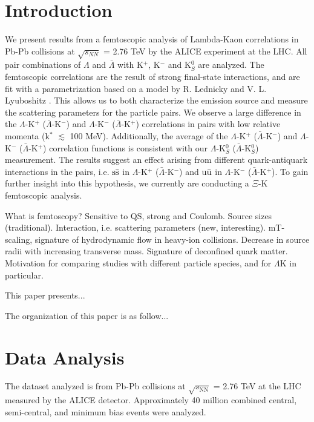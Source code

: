 \documentclass[ALICE,manyauthors]{cernphprep}
\newcommand{\LamK}{$\Lambda$K\xspace}
\begin{document}
\section{Introduction}
\label{sec:Introduction}
We present results from a femtoscopic analysis of Lambda-Kaon correlations in Pb-Pb collisions at $\sqrt{s_{NN}}$ = 2.76 TeV by the ALICE experiment at the LHC.  
All pair combinations of $\Lambda$ and $\bar{\Lambda}$ with K$^{+}$, K$^{-}$ and K$^{0}_{S}$ are analyzed.  
The femtoscopic correlations are the result of strong final-state interactions, and are fit with a parametrization based on a model by R. Lednicky and V. L. Lyuboshitz \cite{Lednicky:82}.  
This allows us to both characterize the emission source and measure the scattering parameters for the particle pairs.  
We observe a large difference in the $\Lambda$-K$^{+}$ ($\bar{\Lambda}$-K$^{-}$) and $\Lambda$-K$^{-}$ ($\bar{\Lambda}$-K$^{+}$) correlations in pairs with low relative momenta (k$^{*}$ $\lesssim$ 100 MeV).  
Additionally, the average of the $\Lambda$-K$^{+}$ ($\bar{\Lambda}$-K$^{-}$) and $\Lambda$-K$^{-}$ ($\bar{\Lambda}$-K$^{+}$) correlation functions is consistent with our $\Lambda$-K$^{0}_{S}$ ($\bar{\Lambda}$-K$^{0}_{S}$) measurement.  
The results suggest an effect arising from different quark-antiquark interactions in the pairs, i.e. $\rm s\bar{s}$ in $\Lambda$-K$^{+}$ ($\bar{\Lambda}$-K$^{-}$) and $\rm u\bar{u}$ in $\Lambda$-K$^{-}$ ($\bar{\Lambda}$-K$^{+}$).  
To gain further insight into this hypothesis, we currently are conducting a $\Xi$-K femtoscopic analysis.

What is femtoscopy?
Sensitive to QS, strong and Coulomb.
Source sizes (traditional).
Interaction, i.e. scattering parameters (new, interesting).
mT-scaling, signature of hydrodynamic flow in heavy-ion collisions.  Decrease in source radii with increasing transverse mass.  Signature of deconfined quark matter.
Motivation for comparing studies with different particle species, and for \LamK in particular.

This paper presents...

The organization of this paper is as follow...

\section{Data Analysis}
\label{sec:DataAnalysis}

The dataset analyzed is from Pb-Pb collisions at $\sqrt{s_{\mathrm{NN}}}$ = 2.76 TeV at the LHC measured by the ALICE detector.
Approximately 40 million combined central, semi-central, and minimum bias events were analyzed.
\end{document}
